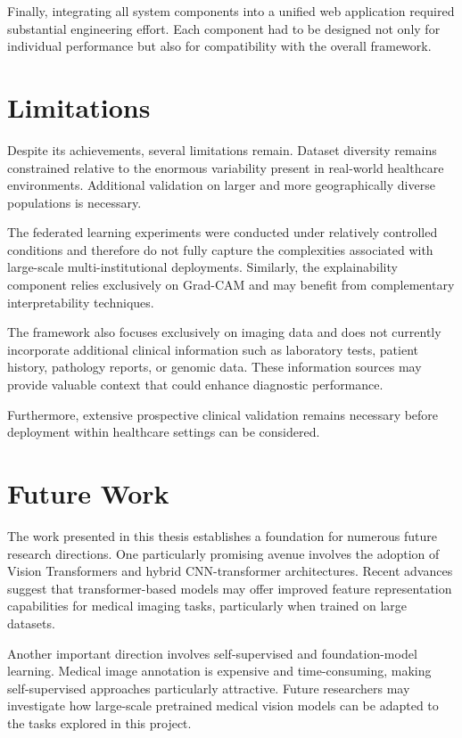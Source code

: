 Finally, integrating all system components into a unified web application required substantial engineering effort. Each component had to be designed not only for individual performance but also for compatibility with the overall framework.

\section{Limitations}

Despite its achievements, several limitations remain. Dataset diversity remains constrained relative to the enormous variability present in real-world healthcare environments. Additional validation on larger and more geographically diverse populations is necessary.

The federated learning experiments were conducted under relatively controlled conditions and therefore do not fully capture the complexities associated with large-scale multi-institutional deployments. Similarly, the explainability component relies exclusively on Grad-CAM and may benefit from complementary interpretability techniques.

The framework also focuses exclusively on imaging data and does not currently incorporate additional clinical information such as laboratory tests, patient history, pathology reports, or genomic data. These information sources may provide valuable context that could enhance diagnostic performance.

Furthermore, extensive prospective clinical validation remains necessary before deployment within healthcare settings can be considered.

\section{Future Work}

The work presented in this thesis establishes a foundation for numerous future research directions. One particularly promising avenue involves the adoption of Vision Transformers and hybrid CNN-transformer architectures. Recent advances suggest that transformer-based models may offer improved feature representation capabilities for medical imaging tasks, particularly when trained on large datasets.

Another important direction involves self-supervised and foundation-model learning. Medical image annotation is expensive and time-consuming, making self-supervised approaches particularly attractive. Future researchers may investigate how large-scale pretrained medical vision models can be adapted to the tasks explored in this project.

